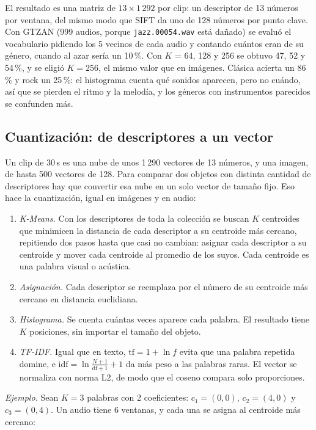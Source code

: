 \documentclass[11pt,a4paper]{article}
\begin{document}
El resultado es una matriz de $13 \times 1\,292$ por clip: un descriptor de 13 números por ventana, del mismo modo que SIFT da uno de 128 números por punto clave. Con GTZAN (999 audios, porque \texttt{jazz.00054.wav} está dañado) se evaluó el vocabulario pidiendo los 5 vecinos de cada audio y contando cuántos eran de su género, cuando al azar sería un 10\,\%. Con $K$ = 64, 128 y 256 se obtuvo 47, 52 y 54\,\%, y se eligió $K = 256$, el mismo valor que en imágenes. Clásica acierta un 86\,\% y rock un 25\,\%: el histograma cuenta qué sonidos aparecen, pero no cuándo, así que se pierden el ritmo y la melodía, y los géneros con instrumentos parecidos se confunden más.

\subsection{Cuantización: de descriptores a un vector}
\label{sec:cuantizacion}

Un clip de 30\,s es una nube de unos 1\,290 vectores de 13 números, y una imagen, de hasta 500 vectores de 128. Para comparar dos objetos con distinta cantidad de descriptores hay que convertir esa nube en un solo vector de tamaño fijo. Eso hace la cuantización, igual en imágenes y en audio:

\begin{enumerate}
  \item \emph{K-Means.} Con los descriptores de toda la colección se buscan $K$ centroides que minimicen la distancia de cada descriptor a su centroide más cercano, repitiendo dos pasos hasta que casi no cambian: asignar cada descriptor a su centroide y mover cada centroide al promedio de los suyos. Cada centroide es una palabra visual o acústica.
  \item \emph{Asignación.} Cada descriptor se reemplaza por el número de su centroide más cercano en distancia euclidiana.
  \item \emph{Histograma.} Se cuenta cuántas veces aparece cada palabra. El resultado tiene $K$ posiciones, sin importar el tamaño del objeto.
  \item \emph{TF-IDF.} Igual que en texto, $\mathrm{tf} = 1 + \ln f$ evita que una palabra repetida domine, e $\mathrm{idf} = \ln\frac{N + 1}{\mathrm{df} + 1} + 1$ da más peso a las palabras raras. El vector se normaliza con norma L2, de modo que el coseno compara solo proporciones.
\end{enumerate}

\emph{Ejemplo.} Sean $K = 3$ palabras con 2 coeficientes: $c_1 = (0, 0)$, $c_2 = (4, 0)$ y $c_3 = (0, 4)$. Un audio tiene 6 ventanas, y cada una se asigna al centroide más cercano:
\end{document}
